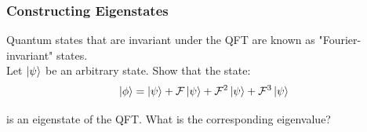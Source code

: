 \subsubsection{Constructing Eigenstates}
Quantum states that are invariant under the QFT are known as "Fourier-invariant" states. \\

Let $\ket{\psi}$ be an arbitrary state. Show that the state:
\begin{equation}
    \ket{\phi} = \ket{\psi} + \mathcal{F}\ket{\psi} + \mathcal{F}^2\ket{\psi} + \mathcal{F}^3\ket{\psi} 
\end{equation}

is an eigenstate of the QFT. What is the corresponding eigenvalue? \\
\noindent{} 
\newline \\\\

